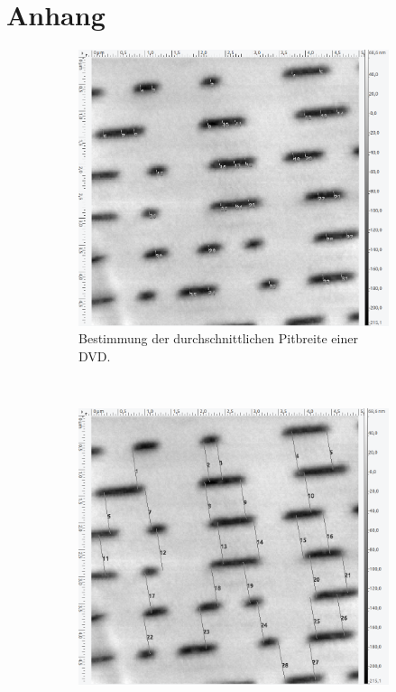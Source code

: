 \section{Anhang}
\label{sec:anhang}

\begin{figure}[H]
\centering
	\begin{subfigure}[t]{0.4\textwidth}
	\includegraphics[width=\textwidth]{AFM_auswertung/dvd_breite.png}
	\caption{Bestimmung der durchschnittlichen Pitbreite einer DVD.}
	\end{subfigure}
	~
	\begin{subfigure}[t]{0.4\textwidth}
	\includegraphics[width=\textwidth]{AFM_auswertung/dvd_abstand.png}

\end{subfigure}
\end{figure}
